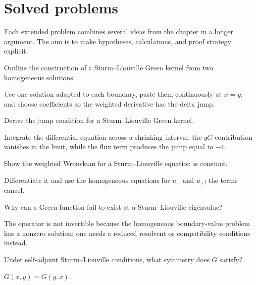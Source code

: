 \section{Solved problems}
Each extended problem combines several ideas from the chapter in a longer argument. The aim is to make hypotheses, calculations, and proof strategy explicit.

\begin{problem}\label{prob:iii26-problem-01}
Outline the construction of a Sturm--Liouville Green kernel from two homogeneous solutions.
\end{problem}
\begin{solution}
Use one solution adapted to each boundary, paste them continuously at
\(x=y\), and choose coefficients so the weighted derivative has the delta
jump.
\end{solution}

\begin{problem}\label{prob:iii26-problem-02}
Derive the jump condition for a Sturm--Liouville Green kernel.
\end{problem}
\begin{solution}
Integrate the differential equation across a shrinking interval; the
\(qG\) contribution vanishes in the limit, while the flux term produces the
jump equal to \(-1\).
\end{solution}

\begin{problem}\label{prob:iii26-problem-03}
Show the weighted Wronskian for a Sturm--Liouville equation is constant.
\end{problem}
\begin{solution}
Differentiate it and use the homogeneous equations for \(u_-\) and
\(u_+\); the terms cancel.
\end{solution}

\begin{problem}\label{prob:iii26-problem-04}
Why can a Green function fail to exist at a Sturm--Liouville eigenvalue?
\end{problem}
\begin{solution}
The operator is not invertible because the homogeneous boundary-value
problem has a nonzero solution; one needs a reduced resolvent or compatibility
conditions instead.
\end{solution}

\begin{problem}[Symmetry]\label{prob:iii26-problem-05}
Under self-adjoint Sturm--Liouville conditions, what symmetry does \(G\) satisfy?
\end{problem}
\begin{solution}
\(G(x,y)=G(y,x)\).
\end{solution}

